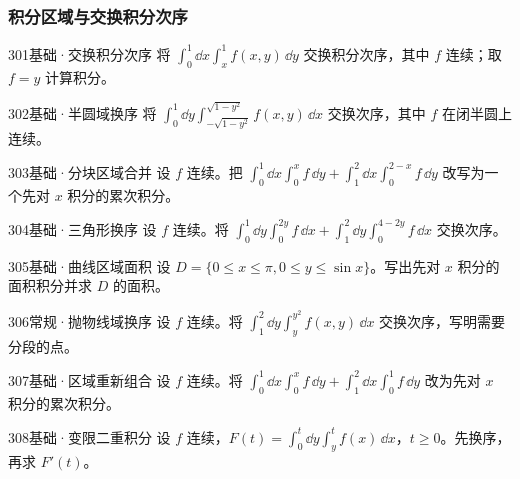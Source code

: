 \subsubsection{积分区域与交换积分次序}
\begin{exercise}{301}{基础·交换积分次序}
将 $\int_0^1\dd x\int_x^1 f(x,y)\,\dd y$ 交换积分次序，其中 $f$ 连续；取 $f=y$ 计算积分。
\end{exercise}
\begin{exercise}{302}{基础·半圆域换序}
将 $\int_0^1\dd y\int_{-\sqrt{1-y^2}}^{\sqrt{1-y^2}}f(x,y)\,\dd x$ 交换次序，其中 $f$ 在闭半圆上连续。
\end{exercise}
\begin{exercise}{303}{基础·分块区域合并}
设 $f$ 连续。把 $\int_0^1\dd x\int_0^x f\,\dd y+\int_1^2\dd x\int_0^{2-x}f\,\dd y$ 改写为一个先对 $x$ 积分的累次积分。
\end{exercise}
\begin{exercise}{304}{基础·三角形换序}
设 $f$ 连续。将 $\int_0^1\dd y\int_0^{2y}f\,\dd x+\int_1^2\dd y\int_0^{4-2y}f\,\dd x$ 交换次序。
\end{exercise}
\begin{exercise}{305}{基础·曲线区域面积}
设 $D=\{0\leq x\leq\pi,0\leq y\leq\sin x\}$。写出先对 $x$ 积分的面积积分并求 $D$ 的面积。
\end{exercise}
\begin{exercise}{306}{常规·抛物线域换序}
设 $f$ 连续。将 $\int_1^2\dd y\int_y^{y^2}f(x,y)\,\dd x$ 交换次序，写明需要分段的点。
\end{exercise}
\begin{exercise}{307}{基础·区域重新组合}
设 $f$ 连续。将 $\int_0^1\dd x\int_0^x f\,\dd y+\int_1^2\dd x\int_0^1 f\,\dd y$ 改为先对 $x$ 积分的累次积分。
\end{exercise}
\begin{exercise}{308}{基础·变限二重积分}
设 $f$ 连续，$F(t)=\int_0^t\dd y\int_y^t f(x)\,\dd x$，$t\geq0$。先换序，再求 $F'(t)$。
\end{exercise}
